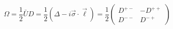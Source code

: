 \begin{equation}
\Omega = \frac{1}{2} \bar{U}D= \frac{1}{2} (\Delta-i\vec{\sigma}\cdot
\vec{\ell})=\frac{1}{2}
\left(
\begin{array}{cc}
D^{+-} & -D^{++} \\
D^{--} & D^{-+}
\end{array}
\right)
\end{equation}

